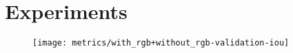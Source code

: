 \section{Experiments}

\begin{figure}[htb]
  \centering
  \texttt{[image: metrics/with\_rgb+without\_rgb-validation-iou]}
\end{figure}

